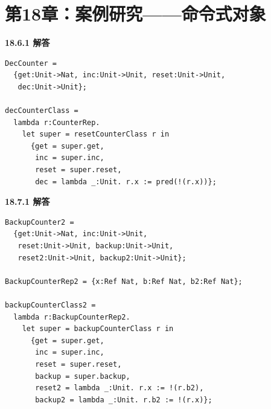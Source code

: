 \newpage
\section{第18章：案例研究——命令式对象}

\begin{taplauthorsolutionentrybox}
\label{sol:author:18.6.1}
\textbf{18.6.1 解答}

\begin{lstlisting}
DecCounter =
  {get:Unit->Nat, inc:Unit->Unit, reset:Unit->Unit,
   dec:Unit->Unit};

decCounterClass =
  lambda r:CounterRep.
    let super = resetCounterClass r in
      {get = super.get,
       inc = super.inc,
       reset = super.reset,
       dec = lambda _:Unit. r.x := pred(!(r.x))};
\end{lstlisting}

\end{taplauthorsolutionentrybox}

\begin{taplauthorsolutionentrybox}
\label{sol:author:18.7.1}
\textbf{18.7.1 解答}

\begin{lstlisting}
BackupCounter2 =
  {get:Unit->Nat, inc:Unit->Unit,
   reset:Unit->Unit, backup:Unit->Unit,
   reset2:Unit->Unit, backup2:Unit->Unit};

BackupCounterRep2 = {x:Ref Nat, b:Ref Nat, b2:Ref Nat};

backupCounterClass2 =
  lambda r:BackupCounterRep2.
    let super = backupCounterClass r in
      {get = super.get,
       inc = super.inc,
       reset = super.reset,
       backup = super.backup,
       reset2 = lambda _:Unit. r.x := !(r.b2),
       backup2 = lambda _:Unit. r.b2 := !(r.x)};
\end{lstlisting}

\end{taplauthorsolutionentrybox}


